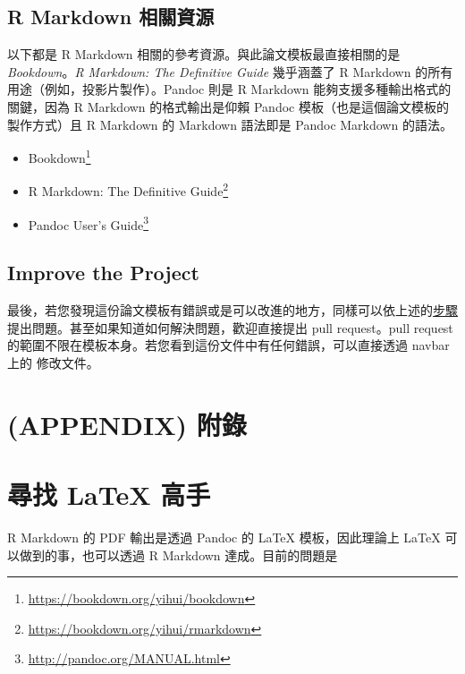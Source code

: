 \documentclass[oneside]{book}
\renewcommand{\href}[2]{#2\footnote{\url{#1}}}
\begin{document}
\hypertarget{rmd-resources}{%
\section*{R Markdown 相關資源}\label{rmd-resources}}

以下都是 R Markdown 相關的參考資源。與此論文模板最直接相關的是 \emph{Bookdown}。\emph{R Markdown: The Definitive Guide} 幾乎涵蓋了 R Markdown 的所有用途（例如，投影片製作）。Pandoc 則是 R Markdown 能夠支援多種輸出格式的關鍵，因為 R Markdown 的格式輸出是仰賴 Pandoc 模板（也是這個論文模板的製作方式）且 R Markdown 的 Markdown 語法即是 Pandoc Markdown 的語法。

\begin{itemize}
\item
  \href{https://bookdown.org/yihui/bookdown}{Bookdown}
\item
  \href{https://bookdown.org/yihui/rmarkdown}{R Markdown: The Definitive Guide}
\item
  \href{http://pandoc.org/MANUAL.html}{Pandoc User's Guide}
\end{itemize}

\hypertarget{improve-the-project-1}{%
\section*{Improve the Project}\label{improve-the-project-1}}

最後，若您發現這份論文模板有錯誤或是可以改進的地方，同樣可以依上述的\protect\hyperlink{issue}{步驟}提出問題。甚至如果知道如何解決問題，歡迎直接提出 pull request。pull request 的範圍不限在模板本身。若您看到這份文件中有任何錯誤，可以直接透過 navbar 上的 修改文件。

\hypertarget{appendix-ux9644ux9304-1}{%
\chapter*{(APPENDIX) 附錄}\label{appendix-ux9644ux9304-1}}

\hypertarget{latex-cite-pkg}{%
\chapter{尋找 LaTeX 高手}\label{latex-cite-pkg}}

R Markdown 的 PDF 輸出是透過 Pandoc 的 LaTeX 模板，因此理論上 LaTeX 可以做到的事，也可以透過 R Markdown 達成。目前的問題是
\end{document}
